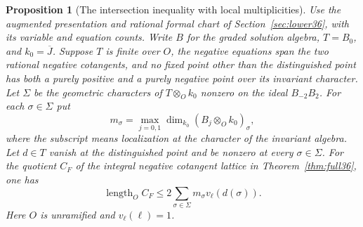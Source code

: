 \documentclass[a4paper,11pt]{article}
\newtheorem{proposition}{Proposition}[section]
\theoremstyle{definition}
\theoremstyle{remark}
\numberwithin{equation}{section}
\begin{document}
\begin{proposition}[The intersection inequality with local multiplicities]\leavevmode
\label{prop:localmult399}
Use the augmented presentation and rational formal chart of
Section~\ref{sec:lower36}, with its variable and equation counts.
Write \(B\) for the graded solution algebra, \(T=B_0\),
and \(k_0=\overline J\). Suppose \(T\) is finite over \(O\), the
negative equations span the two rational negative cotangents,
and no fixed point other than the distinguished point has both
a purely positive and a purely negative point over its invariant
character. Let \(\Sigma\) be the geometric characters of
\(T\otimes_O k_0\) nonzero on the ideal \(B_{-2}B_2\). For each
\(\sigma\in\Sigma\) put
\[
 m_\sigma=\max_{j=0,1}\dim_{k_0}
                  (B_j\otimes_O k_0)_\sigma ,
\]
where the subscript means localization at the character of the
invariant algebra. Let \(d\in T\) vanish at the distinguished
point and be nonzero at every \(\sigma\in\Sigma\). For the quotient
\(C_F\) of the integral negative cotangent lattice in
Theorem~\ref{thm:full36}, one has
\[
       \operatorname{length}_O C_F
          \le 2\sum_{\sigma\in\Sigma}m_\sigma v_\ell(d(\sigma)).
\]
Here \(O\) is unramified and \(v_\ell(\ell)=1\).
\end{proposition}
\end{document}
